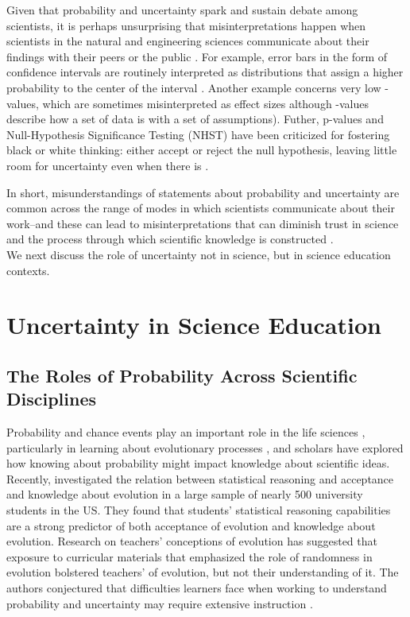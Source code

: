 \documentclass[man, floatsintext]{apa7} %
\begin{document}
Given that probability and uncertainty spark and sustain debate among scientists, it is perhaps unsurprising that misinterpretations happen when scientists in the natural and engineering sciences communicate about their findings with their peers or the public \parencite[]{gkv04, c14, mg17}. For example, error bars in the form of confidence intervals are routinely interpreted as distributions that assign a higher probability to the center of the interval \parencite{kl18}. Another example concerns very low -values, which are sometimes misinterpreted as effect sizes \parencite{gc17, n14} although -values describe how  a set of data is with a set of assumptions). Futher, p-values and Null-Hypothesis Significance Testing (NHST) have been criticized for fostering black or white thinking: either accept or reject the null hypothesis, leaving little room for uncertainty even when there is \parencite[]{cohen_earth_1994,aczel_quantifying_2017}. 

In short, misunderstandings of statements about probability and uncertainty are common across the range of modes in which scientists communicate about their work--and these can lead to misinterpretations that can diminish trust in science and the process through which scientific knowledge is constructed \parencite{vanderbleseffects2020,kreps_model_2020}. \\

We next discuss the role of uncertainty not in science, but in science education contexts. \\

\section{Uncertainty in Science Education}

\subsection{The Roles of Probability Across Scientific Disciplines}


Probability and chance events play an important role in the life sciences \parencite{g03, gk08}, particularly in learning about evolutionary processes \parencite{th17}, and scholars have explored how knowing about probability might impact knowledge about scientific ideas. Recently, \textcite{fsnh19} investigated the relation between statistical reasoning and acceptance and knowledge about evolution in a large sample of nearly 500 university students in the US. They found that students’ statistical reasoning capabilities are a strong predictor of both acceptance of evolution and knowledge about evolution. Research on teachers' conceptions of evolution has suggested that exposure to curricular materials that emphasized the role of randomness in evolution bolstered teachers'  of evolution, but not their understanding of it. The authors conjectured that difficulties learners face when working to understand probability and uncertainty may require extensive instruction \parencite{nadelson2010shifting}. \\
\end{document}

